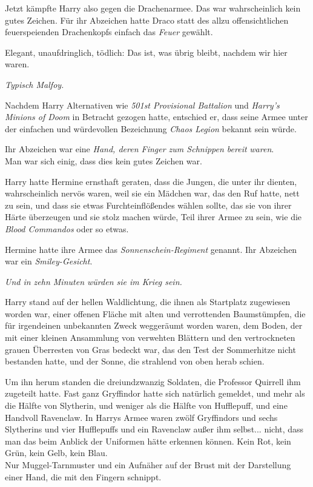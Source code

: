 {Jetzt kämpfte Harry also gegen die Drachenarmee. Das war wahrscheinlich kein gutes Zeichen. Für ihr Abzeichen hatte Draco statt des allzu offensichtlichen feuerspeienden Drachenkopfs einfach das \emph{Feuer} gewählt.

Elegant, unaufdringlich, tödlich: Das ist, was übrig bleibt, nachdem wir hier waren.

\emph{Typisch Malfoy.}

Nachdem Harry Alternativen wie \emph{501st Provisional Battalion} und \emph{Harry's Minions of Doom} in Betracht gezogen hatte, entschied er, dass seine Armee unter der einfachen und würdevollen Bezeichnung \emph{Chaos Legion} bekannt sein würde.

Ihr Abzeichen war eine \emph{Hand, deren Finger zum Schnippen bereit} \emph{waren}.\\ Man war sich einig, dass dies kein gutes Zeichen war.

Harry hatte Hermine ernsthaft geraten, dass die Jungen, die unter ihr dienten, wahrscheinlich nervös waren, weil sie ein Mädchen war, das den Ruf hatte, nett zu sein, und dass sie etwas Furchteinflößendes wählen sollte, das sie von ihrer Härte überzeugen und sie stolz machen würde, Teil ihrer Armee zu sein, wie die \emph{Blood Commandos} oder so etwas.

Hermine hatte ihre Armee das \emph{Sonnenschein-Regiment} genannt. Ihr Abzeichen war ein \emph{Smiley-Gesicht}.

\emph{Und in zehn Minuten würden sie im Krieg sein.}

Harry stand auf der hellen Waldlichtung, die ihnen als Startplatz zugewiesen worden war, einer offenen Fläche mit alten und verrottenden Baumstümpfen, die für irgendeinen unbekannten Zweck weggeräumt worden waren, dem Boden, der mit einer kleinen Ansammlung von verwehten Blättern und den vertrockneten grauen Überresten von Gras bedeckt war, das den Test der Sommerhitze nicht bestanden hatte, und der Sonne, die strahlend von oben herab schien.

Um ihn herum standen die dreiundzwanzig Soldaten, die Professor Quirrell ihm zugeteilt hatte. Fast ganz Gryffindor hatte sich natürlich gemeldet, und mehr als die Hälfte von Slytherin, und weniger als die Hälfte von Hufflepuff, und eine Handvoll Ravenclaw. In Harrys Armee waren zwölf Gryffindors und sechs Slytherins und vier Hufflepuffs und ein Ravenclaw außer ihm selbst... nicht, dass man das beim Anblick der Uniformen hätte erkennen können. Kein Rot, kein Grün, kein Gelb, kein Blau.\\ Nur Muggel-Tarnmuster und ein Aufnäher auf der Brust mit der Darstellung einer Hand, die mit den Fingern schnippt.

}
